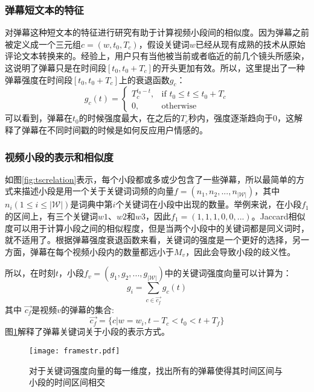 \subsubsection{弹幕短文本的特征}
对弹幕这种短文本的特征进行研究有助于计算视频小段间的相似度。因为弹幕之前被定义成一个三元组$c=(w, t_0, T_c)$，假设关键词$w$已经从现有成熟的技术从原始评论文本转换来的。经验上，用户只有当他被当前或者临近的前几个镜头所感染，这说明了弹幕只是在时间段$[t_0, t_0+T_c]$的开头更加有效。所以，这里提出了一种弹幕强度在时间段$[t_0, t_0+T_c]$上的衰退函数$g_c$：
\begin{equation}
  g_c(t)=
  \begin{cases}
    T_c^{t_0-t}, & \text{if } t_0\le t\le t_0+T_c \\
    0, & \text{otherwise}
  \end{cases}
\label{eq:strength}
\end{equation}
可以看到，弹幕在$t_0$的时候强度最大，在之后的$T_c$秒内，强度逐渐趋向于0，这解释了弹幕在不同时间戳的时候是如何反应用户情感的。

\subsubsection{视频小段的表示和相似度}
如图\ref{fig:tscrelation}表示，每个小段都或多或少包含了一些弹幕，所以最简单的方式来描述小段是用一个关于关键词词频的向量$f=(n_1, n_2,..., n_{|\mathcal{W}|})$，其中$n_i(1\le i\le |\mathcal{W}|)$是词典中第$i$个关键词在小段中出现的数量。举例来说，在小段$f_1$的区间上，有三个关键词$w1$、$w2$和$w3$，因此$f_1=(1, 1, 1, 0, 0, ...)$。Jaccard相似度可以用于计算小段之间的相似程度，但是当两个小段中的关键词都是同义词时，就不适用了。根据弹幕强度衰退函数来看，关键词的强度是一个更好的选择，另一方面，弹幕在每个视频小段内的数量都远小于$M_v$，因此会导致小段的歧义性。

所以，在时刻$t$，小段$f_v=(g_1, g_2,..., g_{|\mathcal{W}|})$中的关键词强度向量可以计算为：
\begin{equation}
  g_i=\sum_{c\in\vec{c_f}}g_c(t)
\label{eq:framestr}
\end{equation}
其中 $\vec{c_f}$是视频$v$的弹幕的集合:
\begin{equation*}
  \vec{c_f}=\{c|w=w_i, t-T_c<t_0<t+T_f \}
\end{equation*}
图\ref{fig:framestr}解释了弹幕关键词关于小段的表示方式。

\begin{figure}
\centering
\texttt{[image: framestr.pdf]}
\caption{对于关键词强度向量的每一维度，找出所有的弹幕使得其时间区间与小段的时间区间相交}
\label{fig:framestr}
\end{figure}


